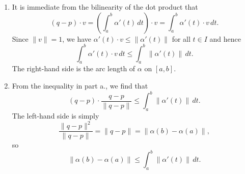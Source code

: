 \begin{ex}
\begin{enumerate}
\item It is immediate from the bilinearity of the dot product that \[(q-p)\cdot v = \left(\int_a^b\alpha'(t)\,dt\right)\cdot v = \int_a^b\alpha'(t)\cdot v\,dt.\] Since $\|v\| = 1$, we have $\alpha'(t)\cdot v \leq \|\alpha'(t)\|$ for all $t \in I$ and hence \[\int_a^b\alpha'(t)\cdot v\,dt \leq \int_a^b\|\alpha'(t)\|\,dt.\] The right-hand side is the arc length of $\alpha$ on $[a, b]$.

\item From the inequality in part a., we find that \[(q-p)\cdot\frac{q-p}{\|q-p\|} \leq \int_a^b\|\alpha'(t)\|\,dt.\] The left-hand side is simply \[\frac{\|q-p\|^2}{\|q-p\|} = \|q-p\| = \|\alpha(b)-\alpha(a)\|,\] so \[\|\alpha(b)-\alpha(a)\| \leq \int_a^b\|\alpha'(t)\|\,dt.\]
\end{enumerate}
\end{ex}